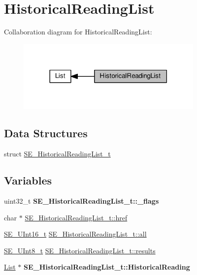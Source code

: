 \hypertarget{group__HistoricalReadingList}{}\section{Historical\+Reading\+List}
\label{group__HistoricalReadingList}
Collaboration diagram for Historical\+Reading\+List\+:\nopagebreak
\begin{figure}[H]
\begin{center}
\leavevmode
\includegraphics[width=258pt]{group__HistoricalReadingList}
\end{center}
\end{figure}
\subsection*{Data Structures}
\begin{DoxyCompactItemize}
\item 
struct \hyperlink{structSE__HistoricalReadingList__t}{S\+E\+\_\+\+Historical\+Reading\+List\+\_\+t}
\end{DoxyCompactItemize}
\subsection*{Variables}
\begin{DoxyCompactItemize}
\item 
\mbox{\label{group__HistoricalReadingList_gaaa1b1e7e32bacea4be37da4f1da89324}} 
uint32\+\_\+t {\bfseries S\+E\+\_\+\+Historical\+Reading\+List\+\_\+t\+::\+\_\+flags}
\item 
char $\ast$ \hyperlink{group__HistoricalReadingList_gadb13f23b1edd9e43645c4be5ca2a99d8}{S\+E\+\_\+\+Historical\+Reading\+List\+\_\+t\+::href}
\item 
\hyperlink{group__UInt16_gac68d541f189538bfd30cfaa712d20d29}{S\+E\+\_\+\+U\+Int16\+\_\+t} \hyperlink{group__HistoricalReadingList_gac457b74ad4a78aafd138081d24cf5907}{S\+E\+\_\+\+Historical\+Reading\+List\+\_\+t\+::all}
\item 
\hyperlink{group__UInt8_gaf7c365a1acfe204e3a67c16ed44572f5}{S\+E\+\_\+\+U\+Int8\+\_\+t} \hyperlink{group__HistoricalReadingList_gae4f835b29c288b7d9ea0db353e3a7528}{S\+E\+\_\+\+Historical\+Reading\+List\+\_\+t\+::results}
\item 
\mbox{\label{group__HistoricalReadingList_gab4b1bafc6b844d85e8cd90c4c8434b42}} 
\hyperlink{structList}{List} $\ast$ {\bfseries S\+E\+\_\+\+Historical\+Reading\+List\+\_\+t\+::\+Historical\+Reading}
\end{DoxyCompactItemize}


